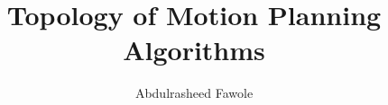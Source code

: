 \usepackage{amsmath, amsfonts, amssymb, amsthm}
\usepackage[
    lmargin=3.7cm,%
	rmargin=2.5cm,%
	bmargin=2.5cm,%
	tmargin=2.5cm %
]{geometry}
\usepackage{graphicx}
\usepackage{float}
\usepackage{apalike}
\usepackage{hyperref}

\graphicspath{ {../images} }

\theoremstyle{definition}
\newtheorem{thm}{Theorem}[section]
\newtheorem{defn}{Definition}[section]
\newtheorem*{notn}{Notation}


\newcommand{\ra}{\rightarrow} %
\newcommand{\lra}{\longrightarrow}  %
\newcommand{\disp}{\displaystyle} %
\newcommand{\QQ}{\mathbb{Q}} %
\newcommand{\NN}{\mathbb{N}} %
\newcommand{\CC}{\mathbb{C}} %
\newcommand{\RR}{\mathbb{R}} %
\newcommand{\htp}[1]{\underset{#1}{\simeq}} %


\title{Topology of Motion Planning Algorithms}
\author{Abdulrasheed Fawole}